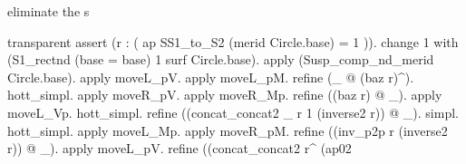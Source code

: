 \begin{coqdoccode}
\begin{coqdoccomment}
\coqdocindent{1.00em}
\coqdoceol
\coqdocindent{1.00em}
\begin{coqdoccomment}
\coqdocindent{0.50em}
eliminate\coqdocindent{0.50em}
the\coqdocindent{0.50em}
s\coqdocindent{0.50em}
\end{coqdoccomment}
\coqdoceol
\coqdocindent{1.00em}
transparent\coqdocindent{0.50em}
assert\coqdocindent{0.50em}
(r\coqdocindent{0.50em}
:\coqdocindent{0.50em}
(\coqdoceol
\coqdocindent{2.00em}
ap\coqdocindent{0.50em}
SS1\_to\_S2\coqdocindent{0.50em}
(merid\coqdocindent{0.50em}
Circle.base)\coqdocindent{0.50em}
=\coqdocindent{0.50em}
1\coqdoceol
\coqdocindent{1.00em}
)).\coqdoceol
\coqdocindent{1.00em}
change\coqdocindent{0.50em}
1\coqdocindent{0.50em}
with\coqdocindent{0.50em}
(S1\_rectnd\coqdocindent{0.50em}
(base\coqdocindent{0.50em}
=\coqdocindent{0.50em}
base)\coqdocindent{0.50em}
1\coqdocindent{0.50em}
surf\coqdocindent{0.50em}
Circle.base).\coqdocindent{0.50em}
\coqdoceol
\coqdocindent{1.00em}
apply\coqdocindent{0.50em}
(Susp\_comp\_nd\_merid\coqdocindent{0.50em}
Circle.base).\coqdoceol
\coqdocindent{1.00em}
apply\coqdocindent{0.50em}
moveL\_pV.\coqdocindent{0.50em}
apply\coqdocindent{0.50em}
moveL\_pM.\coqdoceol
\coqdocindent{1.00em}
refine\coqdocindent{0.50em}
(\_\coqdocindent{0.50em}
@\coqdocindent{0.50em}
(baz\coqdocindent{0.50em}
r)\^{}).\coqdocindent{0.50em}
hott\_simpl.\coqdoceol
\coqdocindent{1.00em}
apply\coqdocindent{0.50em}
moveR\_pV.\coqdocindent{0.50em}
apply\coqdocindent{0.50em}
moveR\_Mp.\coqdoceol
\coqdocindent{1.00em}
refine\coqdocindent{0.50em}
((baz\coqdocindent{0.50em}
r)\coqdocindent{0.50em}
@\coqdocindent{0.50em}
\_).\coqdocindent{0.50em}
apply\coqdocindent{0.50em}
moveL\_Vp.\coqdocindent{0.50em}
hott\_simpl.\coqdoceol
\coqdocindent{1.00em}
refine\coqdocindent{0.50em}
((concat\_concat2\coqdocindent{0.50em}
\_\coqdocindent{0.50em}
r\coqdocindent{0.50em}
1\coqdocindent{0.50em}
(inverse2\coqdocindent{0.50em}
r))\coqdocindent{0.50em}
@\coqdocindent{0.50em}
\_).\coqdocindent{0.50em}
simpl.\coqdocindent{0.50em}
hott\_simpl.\coqdoceol
\coqdocindent{1.00em}
apply\coqdocindent{0.50em}
moveL\_Mp.\coqdocindent{0.50em}
apply\coqdocindent{0.50em}
moveR\_pM.\coqdoceol
\coqdocindent{1.00em}
refine\coqdocindent{0.50em}
((inv\_p2p\coqdocindent{0.50em}
r\coqdocindent{0.50em}
(inverse2\coqdocindent{0.50em}
r))\coqdocindent{0.50em}
@\coqdocindent{0.50em}
\_).\coqdoceol
\coqdocindent{1.00em}
apply\coqdocindent{0.50em}
moveL\_pV.\coqdoceol
\coqdocindent{1.00em}
refine\coqdocindent{0.50em}
((concat\_concat2\coqdocindent{0.50em}
r\^{}\coqdocindent{0.50em}
(ap02\coqdocindent{0.50em}

\end{coqdoccomment}
\end{coqdoccode}
